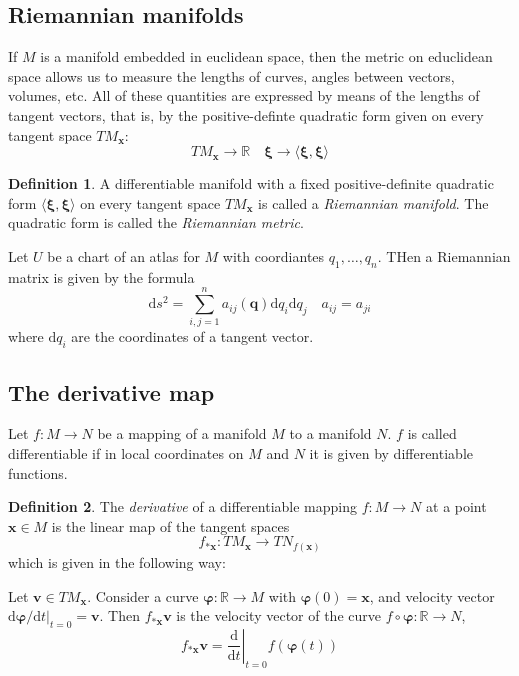 \documentclass[conference]{IEEEtran}
\theoremstyle{definition}
\newtheorem{definition}{Definition}[section]
\theoremstyle{remark}
\begin{document}
    \subsection{Riemannian manifolds}
    If $M$ is a manifold embedded in euclidean space, then the metric on educlidean space allows us to measure the lengths of curves, angles between vectors, volumes, etc. All of these quantities are expressed by means of the lengths of tangent vectors, that is, by the positive-definte quadratic form given on every tangent space $TM_{\mathbf{x}}$:
    \begin{equation*}
        TM_{\mathbf{x}} \to \mathbb{R} \quad \bm{\xi} \to \langle \bm{\xi}, \bm{\xi} \rangle
    \end{equation*}

    \begin{definition}
        A differentiable manifold with a fixed positive-definite quadratic form $\langle \bm{\xi}, \bm{\xi} \rangle$ on every tangent space $TM_\mathbf{x}$ is called a \emph{Riemannian manifold}. The quadratic form is called the \emph{Riemannian metric}.
    \end{definition}

    Let $U$ be a chart of an atlas for $M$ with coordiantes $q_1, \dots, q_n$. THen a Riemannian matrix is given by the formula
    \begin{equation*}
        \mathrm{d} s^2 = \sum_{i, j = 1}^n a_{ij}(\mathbf{q}) \mathrm{d} q_i \mathrm{d} q_j \quad a_{ij} = a_{ji}
    \end{equation*}
    where $\mathrm{d} q_i$ are the coordinates of a tangent vector.

    \subsection{The derivative map}
    Let $f: M \to N$ be a mapping of a manifold $M$ to a manifold $N$. $f$ is called differentiable if in local coordinates on $M$ and $N$ it is given by differentiable functions.

    \begin{definition}
        The \emph{derivative} of a differentiable mapping $f: M \to N$ at a point $\mathbf{x} \in M$ is the linear map of the tangent spaces
        \begin{equation*}
            f_{\mathbf{*x}}: TM_{\mathbf{x}} \to TN_{f(\mathbf{x})}
        \end{equation*}
        which is given in the following way:

        Let $\mathbf{v} \in TM_{\mathbf{x}}$. Consider a curve $\bm{\varphi}: \mathbb{R} \to M$ with $\bm{\varphi}(0) = \mathbf{x}$, and velocity vector $\mathrm{d} \bm{\varphi} / \mathrm{d} t|_{t = 0} = \mathbf{v}$. Then $f_{\mathbf{*x}} \mathbf{v}$ is the velocity vector of the curve $f \circ \bm{\varphi}: \mathbb{R} \to N$,
        \begin{equation*}
            f_{\mathbf{*x}} \mathbf{v} = \left. \dfrac{\mathrm{d}}{\mathrm{d} t} \right|_{t = 0} f(\bm{\varphi}(t))
        \end{equation*}
    \end{definition}
\end{document}
